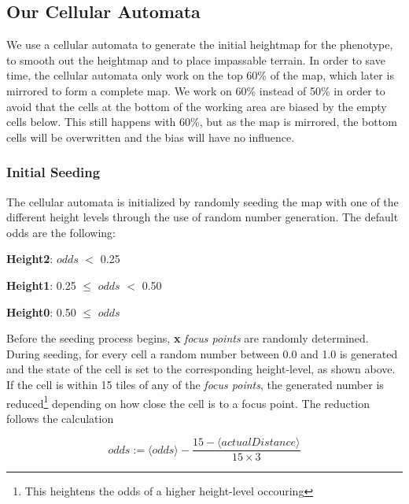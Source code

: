 \subsection{Our Cellular Automata}
\label{methodology_ca_our}

We use a cellular automata to generate the initial heightmap for the phenotype, to smooth out the heightmap and to place impassable terrain. In order to save time, the cellular automata only work on the top 60\% of the map, which later is mirrored to form a complete map. We work on 60\% instead of 50\% in order to avoid that the cells at the bottom of the working area are biased by the empty cells below. This still happens with 60\%, but as the map is mirrored, the bottom cells will be overwritten and the bias will have no influence.

\subsubsection{Initial Seeding}
\label{methodology_ca_our_initial}

The cellular automata is initialized by randomly seeding the map with one of the different height levels through the use of random number generation. The default odds are the following:

\begin{my_itemize}

	\item \textbf{Height2}: $odds$ $<$ 0.25

	\item \textbf{Height1}: 0.25 $\le$ $odds$ $<$ 0.50

	\item \textbf{Height0}: 0.50 $\le$ $odds$

\end{my_itemize}

Before the seeding process begins, \textbf{x} \textit{focus points} are randomly determined. During seeding, for every cell a random number between 0.0 and 1.0 is generated and the state of the cell is set to the corresponding height-level, as shown above. If the cell is within 15 tiles of any of the \textit{focus points}, the generated number is reduced\footnote{This heightens the odds of a higher height-level occouring} depending on how close the cell is to a focus point. The reduction follows the calculation

\begin{equation} \label{eq:oddsReduction}
	odds := \langle odds\rangle - \frac{15 - \langle actualDistance\rangle}{15 \times 3}
\end{equation}


